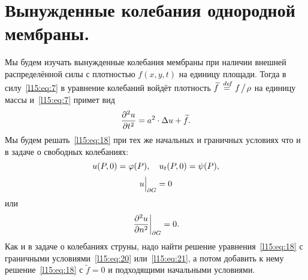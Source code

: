 \documentclass[12pt,a4paper,openany,fleqn]{book}
\newcommand {\defeq}{\stackrel{\hspace{0.09 cm}de\!f}{=}}
\newcommand {\eqdef}{\defeq}
\newcommand{\pdder}[2]{\ensuremath{\frac{\partial^2#1}{\partial#2^2}}}
\theoremstyle{definition}
\begin{document}
	\section{Вынужденные колебания однородной мембраны.}
	\label{lecture15section2}
	Мы будем изучать вынужденные колебания мембраны при наличии внешней распределённой силы с плотностью $f(x,y,t)$ на единицу площади. Тогда в силу~\eqref{l15:eq:7} в уравнение колебаний войдёт плотность $\widetilde{f}\eqdef f\!\bigm/\!\rho$ на единицу массы и~\eqref{l15:eq:7} примет вид
	\begin{equation}\label{l15:eq:18}
		\hfill\pdder{u}{t}=a^2\cdot\Delta u+\widetilde{f}.\hfill
	\end{equation}
	Мы будем решать~\eqref{l15:eq:18} при тех же начальных и граничных условиях что и в задаче о свободных колебаниях:
	\begin{equation}\label{l15:eq:19}
		\hfill u(P,0)=\phi(P),\quad u_t(P,0)=\psi(P),\hfill
	\end{equation} 
	\begin{equation}\label{l15:eq:20}
		\hfill u\Big|_{\partial G}=0\hfill
	\end{equation} 
	или
	\begin{equation}\label{l15:eq:21}
		\hfill \left. \pdder{u}{n}\right|_{\partial G}=0.\hfill
	\end{equation} 
	Как и в задаче о колебаниях струны, надо найти решение уравнения~\eqref{l15:eq:18} с граничными условиями~\eqref{l15:eq:20} или~\eqref{l15:eq:21}, а потом добавить к нему решение~\eqref{l15:eq:18} с $\widetilde{f}=0$ и подходящими начальными условиями.
	
\end{document}
